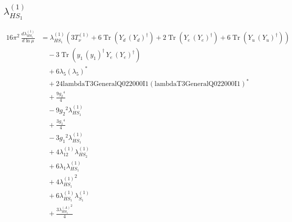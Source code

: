\documentclass[10pt,a4paper]{article}
\begin{document}
\subsection*{$\lambda_{HS_1}^{(1)}$}
\begin{align*}
16\pi^2\,\frac{d \lambda_{HS_1}^{(1)}}{d\ln\mu} &={\lambda_{HS_1}^{(1)}} (3 T_{\nu}^{(1)}+6 \operatorname{Tr}\!\left({Y_d}\,\left({Y_d}\right)^{\dagger}\right)+2 \operatorname{Tr}\!\left({Y_e}\,\left({Y_e}\right)^{\dagger}\right)+6 \operatorname{Tr}\!\left({Y_u}\,\left({Y_u}\right)^{\dagger}\right)) \\
&\quad -3 \operatorname{Tr}\!\left({y_1}\,\left({y_1}\right)^{\dagger}\,{Y_e}\,\left({Y_e}\right)^{\dagger}\right) \\
&\quad +6 {\lambda_5} \left({\lambda_5}\right)^{*} \\
&\quad +24 \text{lambdaT3GeneralQ022000I1} \left(\text{lambdaT3GeneralQ022000I1}\right)^{*} \\
&\quad +\frac{9 {g_2}^4}{4} \\
&\quad -9 {g_2}^2 {\lambda_{HS_1}^{(1)}} \\
&\quad +\frac{3 {g_1}^4}{4} \\
&\quad -3 {g_1}^2 {\lambda_{HS_1}^{(1)}} \\
&\quad +4 {\lambda_{12}^{(1)}} {\lambda_{HS_2}^{(1)}} \\
&\quad +6 {\lambda_1} {\lambda_{HS_1}^{(1)}} \\
&\quad +4 {\lambda_{HS_1}^{(1)}}^2 \\
&\quad +6 {\lambda_{HS_1}^{(1)}} {\lambda_{S_1}^{(1)}} \\
&\quad +\frac{3 {\lambda_{HS_1}^{(A)}}^2}{4} \\
\end{align*}
\end{document}
